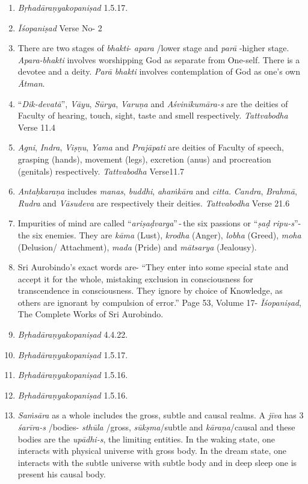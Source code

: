 \begin{enumerate}
\itemsep=1.2pt
\item
  \emph{Bṛhadāraṇyakopaniṣad} 1.5.17.
\item
  \emph{Īśopaniṣad} Verse No- 2
\item
  There are two stages of \emph{bhakti}- \emph{apara} /lower stage and \emph{parā} -higher stage. \emph{Apara-bhakti} involves worshipping God as separate from One-self. There is a devotee and a deity. \emph{Parā} \emph{bhakti} involves contemplation of God as one's own \emph{Ātman}.
\item
  ``\emph{Dik-devatā}'', \emph{Vāyu}, \emph{Sūrya}, \emph{Varuṇa} and \emph{Aśvinīkumāra-s} are the deities of Faculty of hearing, touch, sight, taste and smell respectively. \emph{Tattvabodha} Verse 11.4
\item
  \emph{Agni}, \emph{Indra}, \emph{Viṣṇu}, \emph{Yama} and \emph{Prajāpati} are deities of Faculty of speech, grasping (hands), movement (legs), excretion (anus) and procreation (genitals) respectively. \emph{Tattvabodha} Verse11.7
\item
  \emph{Antaḥkaraṇa} includes \emph{manas}, \emph{buddhi}, \emph{ahaṁkāra} and \emph{citta.} \emph{Candra}, \emph{Brahmā}, \emph{Rudra} and \emph{Vāsudeva} are respectively their deities. \emph{Tattvabodha} Verse 21.6
\item
  Impurities of mind are called ``\emph{ariṣaḍvarga}''\,-\,the six passions or ``\emph{ṣaḍ ripu-s}''- the six enemies. They are \emph{kāma} (Lust), \emph{krodha} (Anger), \emph{lobha} (Greed), \emph{moha} (Delusion/ Attachment), \emph{mada} (Pride) and \emph{mātsarya} (Jealousy).
\item
  Sri Aurobindo's exact words are- ``They enter into some special state and accept it for the whole, mistaking exclusion in consciousness for transcendence in consciousness. They ignore by choice of Knowledge, as others are ignorant by compulsion of error.'' Page 53, Volume 17- \emph{Īśopaniṣad}, The Complete Works of Sri Aurobindo.
\item
  \emph{Bṛhadāraṇyakopaniṣad} 4.4.22.
\item
  \emph{Bṛhadāraṇyakopaniṣad} 1.5.17.
\item
  \emph{Bṛhadāraṇyakopaniṣad} 1.5.16.
\item
  \emph{Bṛhadāraṇyakopaniṣad} 1.5.16.
\item
  \emph{Saṁsāra} as a whole includes the gross, subtle and causal realms. A \emph{jīva} has 3 \emph{śarīra-s} /bodies- \emph{sthūla} /gross, \emph{sūkṣma}/subtle and \emph{kāraṇa}/causal and these bodies are the \emph{upādhi-s}, the limiting entities. In the waking state, one interacts with physical universe with gross body. In the dream state, one interacts with the subtle universe with subtle body and in deep sleep one is present his causal body.

  ­
\end{enumerate}
